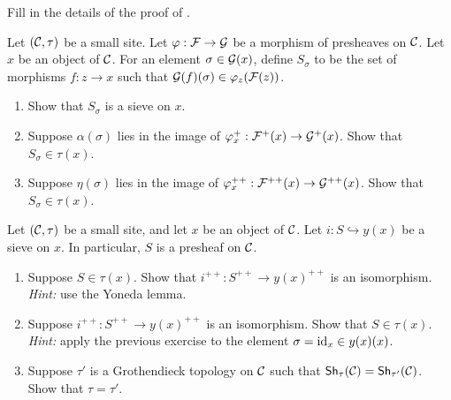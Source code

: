 \begin{exercise}\label{exercise:chap:sheaves:sec:sites:plus construction of a sheaf}
    Fill in the details of the proof of .
\end{exercise}

\begin{exercise}\label{exercise:chap:sheaves:sec:sites:sieve of local preimages}
    Let $(\catC, \tau)$ be a small site. Let $\varphi : \cal{F} \to \cal{G}$ be a morphism of presheaves on $\catC$. Let $x$ be an object of $\catC$. For an element $\sigma \in \cal{G}(x)$, define $S_\sigma$ to be the set of morphisms $f : z \to x$ such that $\cal{G}(f)(\sigma) \in \varphi_z(\cal{F}(z))$.
    \begin{enumerate}[label=(\alph*)]
        \item Show that $S_\sigma$ is a sieve on $x$.
        \item Suppose $\alpha(\sigma)$ lies in the image of $\varphi^+_x : \cal{F}^+(x) \to \cal{G}^+(x)$. Show that $S_\sigma \in \tau(x)$.
        \item Suppose $\eta(\sigma)$ lies in the image of $\varphi^{++}_x : \cal{F}^{++}(x) \to \cal{G}^{++}(x)$. Show that $S_\sigma \in \tau(x)$.
    \end{enumerate}
\end{exercise}

\begin{exercise}\label{exercise:chap:sheaves:sec:sites:topology is determined by its sheaves}
    Let $(\catC,\tau)$ be a small site, and let $x$ be an object of $\catC$. Let $i : S \hookrightarrow y(x)$ be a sieve on $x$. In particular, $S$ is a presheaf on $\catC$.
    \begin{enumerate}[label=(\alph*)]
        \item Suppose $S \in \tau(x)$. Show that $i^{++} : S^{++} \to y(x)^{++}$ is an isomorphism. \textit{Hint:} use the Yoneda lemma.
        \item Suppose $i^{++} : S^{++} \to y(x)^{++}$ is an isomorphism. Show that $S \in \tau(x)$. \textit{Hint:} apply the previous exercise to the element $\sigma = \id_x \in y(x)(x)$.
        \item Suppose $\tau'$ is a Grothendieck topology on $\catC$ such that $\Sh_{\tau}(\catC) = \Sh_{\tau'}(\catC)$. Show that $\tau = \tau'$.
    \end{enumerate}
\end{exercise}


